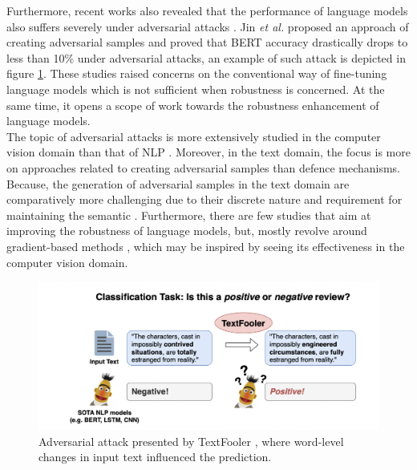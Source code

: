 \documentclass[%
	BCOR=8mm, %
	DIV=12,
	toc=bibliography, %
	toc=listof, %
	oneside, %
	egregdoesnotlikesansseriftitles, %
	]{scrbook}
\begin{document}
Furthermore,  recent works also revealed that the performance of language models also suffers severely under adversarial attacks \cite{li_bert-attack_2020,garg_bae_2020,moradi_evaluating_2021-1}. Jin \textit{et al.} \cite{jin_is_2020}  proposed an approach of creating adversarial samples and proved that BERT accuracy drastically drops to less than 10\% under adversarial attacks, an example of such attack is depicted in figure \ref{diag:ExampleAdversarial}. These studies raised concerns on the conventional way of fine-tuning language models which is not sufficient when robustness is concerned. At the same time, it opens a scope of work towards the robustness enhancement of language models.\\
The topic of adversarial attacks is more extensively studied in the computer vision domain than that of NLP \cite{wang_towards_2021}. Moreover, in the text domain, the focus is more on approaches related to creating adversarial samples than defence mechanisms. Because, the generation of adversarial samples in the text domain are comparatively more challenging due to their discrete nature and requirement for maintaining the semantic \cite{li_bert-attack_2020}. Furthermore, there are few studies that aim at improving the robustness of language models, but, mostly revolve around gradient-based methods \cite{zhu_at-bert_2021,miyato_adversarial_2017,jiang_smart_2020-1}, which may be inspired by seeing its effectiveness in the computer vision domain.\\
\begin{figure}[H]
    \centering
    \includegraphics[width=.85\textwidth]{img/Introduction-Fig-1.png}
    \caption[Example of adversarial attack in text-domain]{Adversarial attack presented by TextFooler \cite{jin_is_2020}, where word-level changes in input text influenced the prediction.}
    \label{diag:ExampleAdversarial}
\end{figure}
\end{document}
